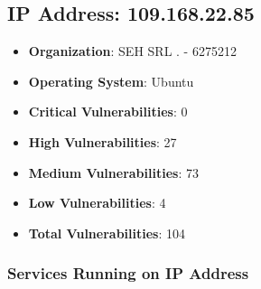 \documentclass{article}
\begin{document}
\clearpage



\subsection{IP Address: 109.168.22.85}

\begin{itemize}
    \item \textbf{Organization}: SEH SRL . - 6275212
    \item \textbf{Operating System}:  Ubuntu 
    \item \textbf{Critical Vulnerabilities}: 0
    \item \textbf{High Vulnerabilities}: 27
    \item \textbf{Medium Vulnerabilities}: 73
    \item \textbf{Low Vulnerabilities}: 4
    \item \textbf{Total Vulnerabilities}: 104
\end{itemize}

\subsubsection*{Services Running on IP Address}
\end{document}
